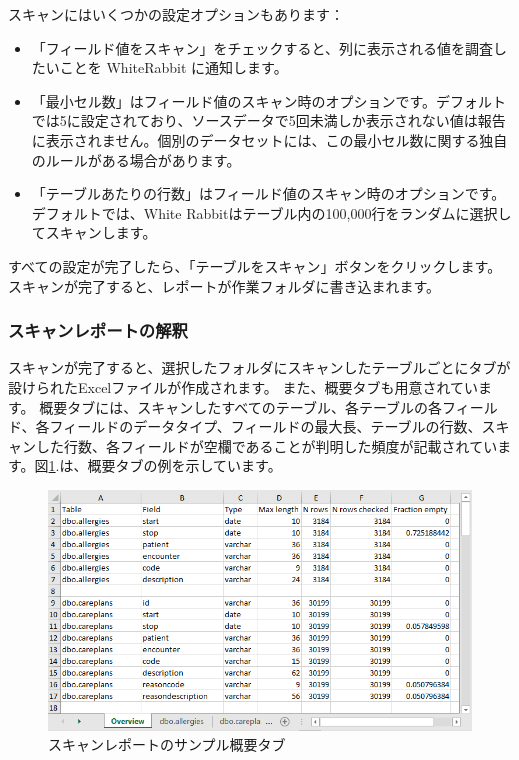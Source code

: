 \documentclass[
  11pt]{book}
\providecommand{\tightlist}{%
  \setlength{\itemsep}{0pt}\setlength{\parskip}{0pt}}
\theoremstyle{definition}
\theoremstyle{definition}
\theoremstyle{definition}
\theoremstyle{definition}
\theoremstyle{remark}
\begin{document}
スキャンにはいくつかの設定オプションもあります：

\begin{itemize}
\tightlist
\item
  「フィールド値をスキャン」をチェックすると、列に表示される値を調査したいことを WhiteRabbit に通知します。
\item
  「最小セル数」はフィールド値のスキャン時のオプションです。デフォルトでは5に設定されており、ソースデータで5回未満しか表示されない値は報告に表示されません。個別のデータセットには、この最小セル数に関する独自のルールがある場合があります。
\item
  「テーブルあたりの行数」はフィールド値のスキャン時のオプションです。デフォルトでは、White Rabbitはテーブル内の100,000行をランダムに選択してスキャンします。
\end{itemize}

すべての設定が完了したら、「テーブルをスキャン」ボタンをクリックします。スキャンが完了すると、レポートが作業フォルダに書き込まれます。

\subsubsection*{スキャンレポートの解釈}\label{ux30b9ux30adux30e3ux30f3ux30ecux30ddux30fcux30c8ux306eux89e3ux91c8}

スキャンが完了すると、選択したフォルダにスキャンしたテーブルごとにタブが設けられたExcelファイルが作成されます。 また、概要タブも用意されています。 概要タブには、スキャンしたすべてのテーブル、各テーブルの各フィールド、各フィールドのデータタイプ、フィールドの最大長、テーブルの行数、スキャンした行数、各フィールドが空欄であることが判明した頻度が記載されています。図\ref{fig:ScanOverviewTab}.は、概要タブの例を示しています。

\begin{figure}

{\centering \includegraphics[width=1\linewidth]{images/ExtractTransformLoad/ScanOverviewTab} 

}

\caption{スキャンレポートのサンプル概要タブ}\label{fig:ScanOverviewTab}
\end{figure}
\end{document}
